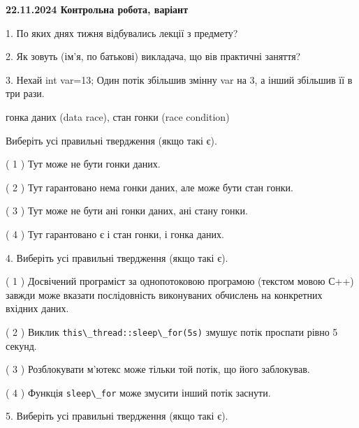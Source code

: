 \documentclass[12pt, ukrainian]{article}
\def\code#1{\Verb!#1!}
\begin{document}
\vspace{4mm}
\newpage
\begin {large}

\textbf{22.11.2024 Контрольна робота, варіант  }\par


{
1. По яких днях тижня відбувались лекції з предмету?



\vspace{5mm}
2. Як зовуть (ім'я, по батькові) викладача, що вів практичні заняття?



\vspace{5mm}
3. Нехай int var=13; Один потік збільшив змінну var на 3, а інший збільшив її в три рази.

гонка даних (data race), стан гонки (race condition)

Виберіть усі правильні твердження (якщо такі є).\par
\vspace{2mm}
( 1 ) Тут може не бути гонки даних.%

( 2 ) Тут гарантовано нема гонки даних, але може бути стан гонки.%

( 3 ) Тут може не бути ані гонки даних, ані стану гонки.%

( 4 ) Тут гарантовано є і стан гонки, і гонка даних.%


\vspace{5mm}
4. Виберіть усі правильні твердження (якщо такі є).\par
\vspace{2mm}

( 1 ) Досвічений програміст за однопотоковою програмою (текстом мовою С++) завжди може вказати послідовність виконуваних обчислень на конкретних вхідних даних.%

( 2 ) Виклик \code{this\_thread::sleep\_for(5s)} змушує потік проспати рівно 5 секунд.%

( 3 ) Розблокувати м’ютекс може тільки той потік, що його заблокував.%

( 4 ) Функція \code{sleep\_for} може змусити інший потік заснути.%


\vspace{5mm}
5. Виберіть усі правильні твердження (якщо такі є).\par
\vspace{2mm}

}
\end{large}
\end{document}
